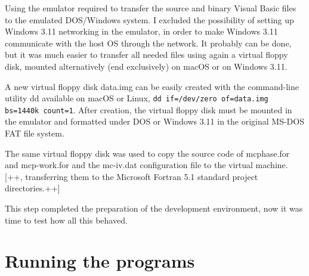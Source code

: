 
Using the emulator required to transfer the source and binary Visual Basic files to the emulated DOS/Windows system.
I excluded the possibility of setting up Windows 3.11 networking in the emulator, in order to make Windows 3.11 communicate with the host OS through the network.
It probably can be done, but it was much easier to transfer all needed files using again a virtual floppy disk, mounted alternatively (end exclusively) on macOS or on Windows 3.11.

A new virtual floppy disk \textsf{data.img} can be easily created with the command-line utility \textsf{dd} available on macOS or Linux, \lstinline[columns=fixed]{dd if=/dev/zero of=data.img bs=1440k count=1}. After creation, the virtual floppy disk must be mounted in the emulator and formatted under DOS or Windows 3.11 in the original MS-DOS FAT file system.



The same virtual floppy disk was used to copy the source code of \textsf{mcphase.for} and \textsf{mcp-work.for} and the \textsf{mc-iv.dat} configuration file to the virtual machine.
[++, transferring them to the Microsoft Fortran 5.1 standard project directories.++]

%

This step completed the preparation of the development environment, now it was time to test how all this behaved.



\section{Running the programs}

